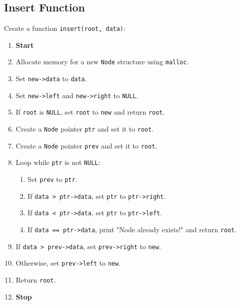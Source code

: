 {  \subsection{Insert Function}
  Create a function \texttt{insert(root, data)}:
  \begin{enumerate}[label=\arabic*:,left=0pt]
    \item \textbf{Start}
    \item Allocate memory for a new \texttt{Node} structure using \texttt{malloc}.
    \item Set \texttt{new->data} to \texttt{data}.
    \item Set \texttt{new->left} and \texttt{new->right} to \texttt{NULL}.
    \item If \texttt{root} is \texttt{NULL}, set \texttt{root} to \texttt{new} and return \texttt{root}.
    \item Create a \texttt{Node} pointer \texttt{ptr} and set it to \texttt{root}.
    \item Create a \texttt{Node} pointer \texttt{prev} and set it to \texttt{root}.
    \item Loop while \texttt{ptr} is not \texttt{NULL}:
          \begin{enumerate}[label=8.\arabic*:, start=1]
            \item Set \texttt{prev} to \texttt{ptr}.
            \item If \texttt{data > ptr->data}, set \texttt{ptr} to \texttt{ptr->right}.
            \item If \texttt{data < ptr->data}, set \texttt{ptr} to \texttt{ptr->left}.
            \item If \texttt{data == ptr->data}, print "Node already exists!" and return \texttt{root}.
          \end{enumerate}
    \item If \texttt{data > prev->data}, set \texttt{prev->right} to \texttt{new}.
    \item Otherwise, set \texttt{prev->left} to \texttt{new}.
    \item Return \texttt{root}.
    \item \textbf{Stop}
  \end{enumerate}

}
